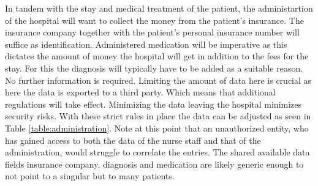 In tandem with the stay and medical treatment of the patient, the administartion of the hospital will want to collect the money from the patient's insurance. The insurance company together with the patient's personal insurance number will suffice as identification. 
Administered medication will be imperative as this dictates the amount of money the hospital will get in addition to the fees for the stay. For this the diagnosis will typically have to be added as a suitable reason. No further information is required. Limiting the amount of data here 
is crucial as here the data is exported to a third party. Which means that additional regulations will take effect. Minimizing the data leaving the hospital minimizes security risks. With these strict rules in place the data can be adjusted as seen in Table \ref{table:administration}. \newline 
Note at this point that an unauthorized entity, who has gained access to both the data of the nurse staff and that of the administration, would struggle to correlate the entries. The shared available data fields insurance company, diagnosis and medication are likely generic enough to not point to a singular but to many patients. 

\bigskip

